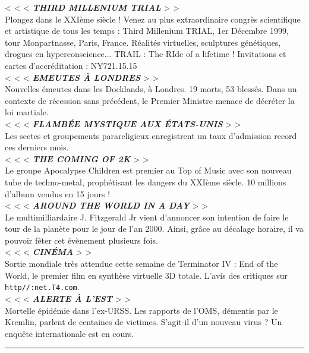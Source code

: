 \documentclass[11pt,twoside,a4paper]{book}
\begin{document}
< < <  \textbf{\textit{THIRD MILLENIUM TRIAL}} > >~\\
Plongez dans le XXI{\`e}me si{\`e}cle ! Venez au plus extraordinaire congr{\`e}s scientifique et artistique de tous les temps : Third Millenium TRIAL, 1er D{\'e}cembre 1999, tour Monpartnasse, Paris, France. R{\'e}alit{\'e}s virtuelles, sculptures g{\'e}n{\'e}tiques, drogues en hyperconscience... TRAIL : The RIde of a lifetime ! Invitations et cartes d'accr{\'e}ditation : NY721.15.15~\\
< < <  \textbf{\textit{EMEUTES {\`A} LONDRES}} > >~\\
Nouvelles {\'e}meutes dans les Docklands, {\`a} Londres. 19 morts, 53 bless{\'e}s. Dans un contexte de r{\'e}cession sans pr{\'e}c{\'e}dent, le Premier Ministre menace de d{\'e}cr{\'e}ter la loi martiale.~\\
< < <  \textbf{\textit{FLAMB{\'E}E MYSTIQUE AUX {\'E}TATS-UNIS}} > >~\\
Les sectes et groupements parareligieux enregistrent un taux d'admission record ces derniers mois.~\\
< < <  \textbf{\textit{THE COMING OF 2K}} > >~\\
Le groupe Apocalypse Children est premier au Top of Music avec son nouveau tube de techno-metal, proph{\'e}tisant les dangers du XXI{\`e}me si{\`e}cle. 10 millions d'album vendus en 15 jours !~\\
< < <  \textbf{\textit{AROUND THE WORLD IN A DAY}} > >~\\
Le multimilliardaire J. Fitzgerald Jr vient d'annoncer son intention de faire le tour de la plan{\`e}te pour le jour de l'an 2000. Ainsi, gr{\^a}ce au d{\'e}calage horaire, il va pouvoir f{\^e}ter cet {\'e}v{\`e}nement plusieurs fois.~\\
< < <  \textbf{\textit{CIN{\'E}MA}} > >~\\
Sortie mondiale tr{\`e}s attendue cette semaine de Terminator IV : End of the World, le premier film en synth{\`e}se virtuelle 3D totale. L'avis des critiques sur \texttt{http//:net.T4.com}.~\\
< < <  \textbf{\textit{ALERTE {\`A} L'EST}} > >~\\
Mortelle {\'e}pid{\'e}mie dans l'ex-URSS. Les rapports de l'OMS, d{\'e}mentis par le Kremlin, parlent de centaines de victimes. S'agit-il d'un nouveau virus ? Un enqu{\^e}te internationale est en cours.~\\

\hrule 

\clearpage
\end{document}
